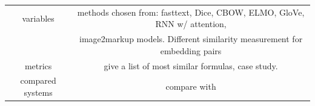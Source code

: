 \documentclass[11pt]{artikel3}
\begin{document}
\begin{table}
\begin{tabular}{c|c}
		variables & methods chosen from: fasttext, Dice, CBOW, ELMO, GloVe, RNN w/ attention, \\

		          & image2markup models. Different similarity measurement for embedding pairs \\

		\hline

		metrics & give a list of most similar formulas, case study. \\

		\hline

		compared systems & compare with \cite{BehroozICTIR2019} \\

	\end{tabular}



\end{table}
\end{document}
